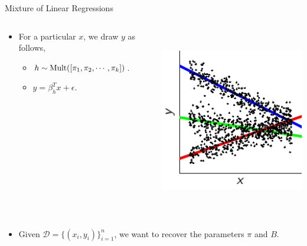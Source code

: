
\begin{block}{Mixture of Linear Regressions}
  \begin{columns}[onlytextwidth]
    \begin{column}{0.55\textwidth}
      \begin{itemize}
        \item For a particular $x$, we draw $y$ as follows,
        \begin{itemize}
          \item $h \sim \mathrm{Mult}([\pi_1, \pi_2, \cdots, \pi_k])$.
          \item $y = \beta_h^T x + \epsilon$.
        \end{itemize}
      \end{itemize}
    \end{column}
    \hfill
    \begin{column}{0.45\textwidth}
        \includegraphics[width=7cm,height=8cm,keepaspectratio]{figures/mlr-5.pdf}
    \end{column}
  \end{columns}

  \begin{itemize}
    \item Given $\mathcal{D} = \{(x_i,y_i)\}_{i=1}^n$, we want to recover the parameters $\pi$ and $B$.
\end{itemize}
\end{block}
